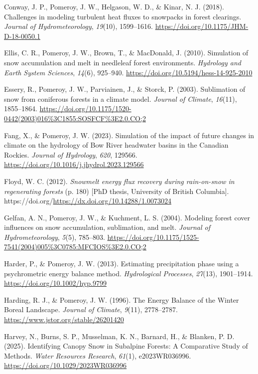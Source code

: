 \documentclass[
]{agujournal2019}
\newlength{\cslhangindent}
\newenvironment{CSLReferences}[2] %
 {\begin{list}{}{%
  \setlength{\itemindent}{0pt}
  \setlength{\leftmargin}{0pt}
  \setlength{\parsep}{0pt}
  \ifodd #1
   \setlength{\leftmargin}{\cslhangindent}
   \setlength{\itemindent}{-1\cslhangindent}
  \fi
  \setlength{\itemsep}{#2\baselineskip}}}
 {\end{list}}
\begin{document}
\begin{CSLReferences}{1}{0}
Conway, J. P., Pomeroy, J. W., Helgason, W. D., \& Kinar, N. J. (2018).
Challenges in modeling turbulent heat fluxes to snowpacks in forest
clearings. \emph{Journal of Hydrometeorology}, \emph{19}(10),
1599--1616. \url{https://doi.org/10.1175/JHM-D-18-0050.1}

Ellis, C. R., Pomeroy, J. W., Brown, T., \& MacDonald, J. (2010).
Simulation of snow accumulation and melt in needleleaf forest
environments. \emph{Hydrology and Earth System Sciences}, \emph{14}(6),
925--940. \url{https://doi.org/10.5194/hess-14-925-2010}

Essery, R., Pomeroy, J. W., Parviainen, J., \& Storck, P. (2003).
Sublimation of snow from coniferous forests in a climate model.
\emph{Journal of Climate}, \emph{16}(11), 1855--1864.
\url{https://doi.org/10.1175/1520-0442(2003)016\%3C1855:SOSFCF\%3E2.0.CO;2}

Fang, X., \& Pomeroy, J. W. (2023). Simulation of the impact of future
changes in climate on the hydrology of {Bow River} headwater basins in
the {Canadian Rockies}. \emph{Journal of Hydrology}, \emph{620}, 129566.
\url{https://doi.org/10.1016/j.jhydrol.2023.129566}

Floyd, W. C. (2012). \emph{Snowmelt energy flux recovery during
rain-on-snow in regenerating forests} (p. 180) {[}PhD thesis, University
of British Columbia{]}.
https://doi.org/\url{https://dx.doi.org/10.14288/1.0073024}

Gelfan, A. N., Pomeroy, J. W., \& Kuchment, L. S. (2004). Modeling
forest cover influences on snow accumulation, sublimation, and melt.
\emph{Journal of Hydrometeorology}, \emph{5}(5), 785--803.
\url{https://doi.org/10.1175/1525-7541(2004)005\%3C0785:MFCIOS\%3E2.0.CO;2}

Harder, P., \& Pomeroy, J. W. (2013). Estimating precipitation phase
using a psychrometric energy balance method. \emph{Hydrological
Processes}, \emph{27}(13), 1901--1914.
\url{https://doi.org/10.1002/hyp.9799}

Harding, R. J., \& Pomeroy, J. W. (1996). The {Energy Balance} of the
{Winter Boreal Landscape}. \emph{Journal of Climate}, \emph{9}(11),
2778--2787. \url{https://www.jstor.org/stable/26201420}

Harvey, N., Burns, S. P., Musselman, K. N., Barnard, H., \& Blanken, P.
D. (2025). Identifying {Canopy Snow} in {Subalpine Forests}: {A
Comparative Study} of {Methods}. \emph{Water Resources Research},
\emph{61}(1), e2023WR036996. \url{https://doi.org/10.1029/2023WR036996}


\end{CSLReferences}
\end{document}
